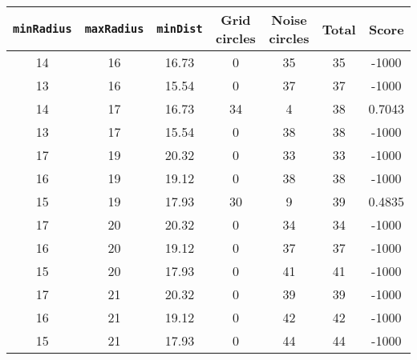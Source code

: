\documentclass[letterpaper, 12pt]{article}
\begin{document}
\begin{longtable}{|c|c|c|c|c|c|c|}
\hline
\textbf{\texttt{minRadius}} & \textbf{\texttt{maxRadius}} & \textbf{\texttt{minDist}} & \textbf{Grid circles} & \textbf{Noise circles} & \textbf{Total} & \textbf{Score} \\
\hline
14 & 16 & 16.73 & 0 & 35 & 35 & -1000 \\
\hline
13 & 16 & 15.54 & 0 & 37 & 37 & -1000 \\
\hline
14 & 17 & 16.73 & 34 & 4 & 38 & 0.7043 \\
\hline
13 & 17 & 15.54 & 0 & 38 & 38 & -1000 \\
\hline
17 & 19 & 20.32 & 0 & 33 & 33 & -1000 \\
\hline
16 & 19 & 19.12 & 0 & 38 & 38 & -1000 \\
\hline
15 & 19 & 17.93 & 30 & 9 & 39 & 0.4835 \\
\hline
17 & 20 & 20.32 & 0 & 34 & 34 & -1000 \\
\hline
16 & 20 & 19.12 & 0 & 37 & 37 & -1000 \\
\hline
15 & 20 & 17.93 & 0 & 41 & 41 & -1000 \\
\hline
17 & 21 & 20.32 & 0 & 39 & 39 & -1000 \\
\hline
16 & 21 & 19.12 & 0 & 42 & 42 & -1000 \\
\hline
15 & 21 & 17.93 & 0 & 44 & 44 & -1000 \\
\hline
\end{longtable}
\end{document}
